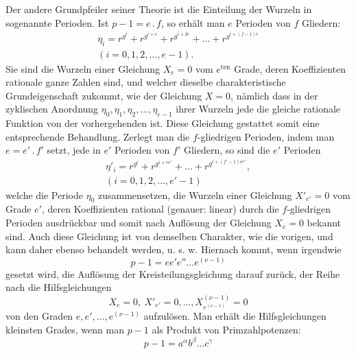 Der andere Grundpfeiler seiner Theorie ist die Einteilung der Wurzeln in sogenannte Perioden. Ist \(p-1=e\mathbin{.}f\), so erhält man \(e\) Perioden von \(f\) Gliedern:
\[
\begin{gathered}
\eta_i=r^{g^i}+r^{g^{i+e}}+r^{g^{i+2e}}+\ldots+r^{g^{i+(f-1)e}}\\
(i=0,1,2,\ldots,e-1).
\end{gathered}
\]
Sie sind die Wurzeln einer Gleichung \(X_e=0\) vom \(e^{\mathrm{ten}}\) Grade, deren Koeffizienten rationale ganze Zahlen sind, und welcher dieselbe charakteristische Grundeigenschaft zukommt, wie der Gleichung \(X=0\), nämlich dass in der zyklischen Anordnung \(\eta_0,\eta_1,\eta_2,\ldots,\eta_{e-1}\) ihrer Wurzeln jede die gleiche rationale Funktion von der vorhergehenden ist. Diese Gleichung gestattet somit eine entsprechende Behandlung. Zerlegt man die \(f\)-gliedrigen Perioden, indem man \(e=e'\mathbin{.}f'\) setzt, jede in \(e'\) Perioden von \(f'\) Gliedern, so sind die \(e'\) Perioden
\[
\begin{gathered}
\eta'_i=r^{g^i}+r^{g^{i+ee'}}+\ldots+r^{g^{i+(f'-1)ee'}},\\
(i=0,1,2,\ldots,e'-1)
\end{gathered}
\]
welche die Periode \(\eta_0\) zusammensetzen, die Wurzeln einer Gleichung \(X'_{e'}=0\) vom Grade \(e'\), deren Koeffizienten rational (genauer: linear) durch die \(f\)-gliedrigen Perioden ausdrückbar und somit nach Auflösung der Gleichung \(X_e=0\) bekannt sind. Auch diese Gleichung ist von demselben Charakter, wie die
\newpage{}
\noindent vorigen, und kann daher ebenso behandelt werden, u. s. w. Hiernach kommt, wenn irgendwie
\[
p-1=ee'e''\ldots e^{(\nu-1)}
\]
gesetzt wird, die Auflösung der Kreisteilungsgleichung darauf zurück, der Reihe nach die Hilfsgleichungen
\[
X_e=0,\ X'_{e'}=0,\ldots,X^{(\nu-1)}_{e^{(\nu-1)}}=0
\]
von den Graden \(e,e',\ldots,e^{(\nu-1)}\) aufzulösen. Man erhält die Hilfsgleichungen kleinsten Grades, wenn man \(p-1\) als Produkt von Primzahlpotenzen:
\[
p-1=a^\alpha b^\beta\ldots c^\gamma
\]
